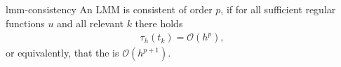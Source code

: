 \begin{Definition}{lmm-consistency}
  An LMM is consistent of order $p$, if for all sufficient regular
  functions $u$ and all relevant $k$ there holds
  \begin{gather}
    \label{eq:lmm:11}
    \tau_h(t_k) = \mathcal O(h^p),
  \end{gather}
  or equivalently, that the  is $\mathcal O(h^{p+1})$.
\end{Definition}


